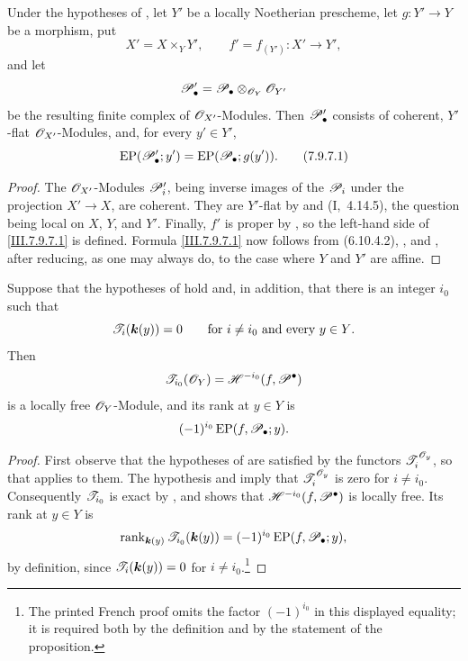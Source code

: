 \begin{proposition}[7.9.7]
\label{III.7.9.7}
Under the hypotheses of , let $Y'$ be a
locally Noetherian prescheme, let $g:Y'\to Y$ be a
morphism, put
\[
  X'=X\times_Y Y',\qquad
  f'=f_{(Y')}:X'\longrightarrow Y',
\]
and let
\[
  \mathscr{P}'_\bullet
  =
  \mathscr{P}_\bullet\otimes_{\mathscr{O}_Y}\mathscr{O}_{Y'}
\]
be the resulting finite complex of $\mathscr{O}_{X'}$-Modules.
Then $\mathscr{P}'_\bullet$ consists of coherent,
$Y'$-flat $\mathscr{O}_{X'}$-Modules, and, for every
$y'\in Y'$,
\[
  \operatorname{EP}(\mathscr{P}'_\bullet;y')
  =
  \operatorname{EP}(\mathscr{P}_\bullet;g(y')).
  \tag{7.9.7.1}\label{III.7.9.7.1}
\]
\end{proposition}

\begin{proof}
The $\mathscr{O}_{X'}$-Modules $\mathscr{P}'_i$, being inverse images
of the $\mathscr{P}_i$ under the projection $X'\to X$, are
coherent.  They are $Y'$-flat by  and
(I,~4.14.5), the question being local on $X$, $Y$,
and $Y'$.  Finally, $f'$ is proper by
, so the left-hand side of
\eqref{III.7.9.7.1} is defined.  Formula
\eqref{III.7.9.7.1} now follows from
\textup{(6.10.4.2)}, , and
, after reducing, as one may always do, to
the case where $Y$ and $Y'$ are affine.
\end{proof}

\begin{proposition}[7.9.8]
\label{III.7.9.8}
Suppose that the hypotheses of  hold and,
in addition, that there is an integer $i_0$ such that
\[
  \mathscr{T}_i(\boldsymbol{k}(y))=0
  \qquad\text{for $i\neq i_0$ and every $y\in Y$.}
\]
Then
\[
  \mathscr{T}_{i_0}(\mathscr{O}_Y)
  =
  \mathscr{H}^{-i_0}(f,\mathscr{P}^\bullet)
\]
is a locally free $\mathscr{O}_Y$-Module, and its rank at
$y\in Y$ is
\[
  (-1)^{i_0}\operatorname{EP}(f,\mathscr{P}_\bullet;y).
\]
\end{proposition}

\begin{proof}
First observe that the hypotheses of  are
satisfied by the functors $\mathscr{T}^{\mathscr{O}_y}_i$, so that
 applies to them.  The hypothesis and
 imply that
$\mathscr{T}^{\mathscr{O}_y}_i$ is zero for $i\neq i_0$.
Consequently $\mathscr{T}_{i_0}$ is exact by
, and  shows that
$\mathscr{H}^{-i_0}(f,\mathscr{P}^\bullet)$ is locally free.
Its rank at $y\in Y$ is
\[
  \operatorname{rank}_{\boldsymbol{k}(y)}
    \mathscr{T}_{i_0}(\boldsymbol{k}(y))
  =
  (-1)^{i_0}\operatorname{EP}(f,\mathscr{P}_\bullet;y),
\]
by definition, since $\mathscr{T}_i(\boldsymbol{k}(y))=0$ for
$i\neq i_0$.\footnote{The printed French proof omits the
factor $(-1)^{i_0}$ in this displayed equality; it is
required both by the definition and by the statement of
the proposition.}
\end{proof}

